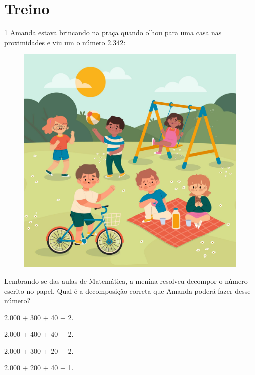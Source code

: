
\pagebreak
\section*{Treino}

\num{1} Amanda estava brincando na praça quando olhou para uma casa nas proximidades e viu um
o número 2.342:

\begin{figure}[htpb!]
\centering
\includegraphics[width=\textwidth]{media/image8a.jpeg}
\end{figure}

Lembrando-se das aulas de Matemática, a menina resolveu decompor o número escrito
no papel. Qual é a decomposição correta que Amanda poderá fazer desse
número?

\begin{multicols}{2}
\begin{escolha}
\item
  2.000 + 300 + 40 + 2.
\item
  2.000 + 400 + 40 + 2.
\item
  2.000 + 300 + 20 + 2.
\item
  2.000 + 200 + 40 + 1.
\end{escolha}
\end{multicols}

